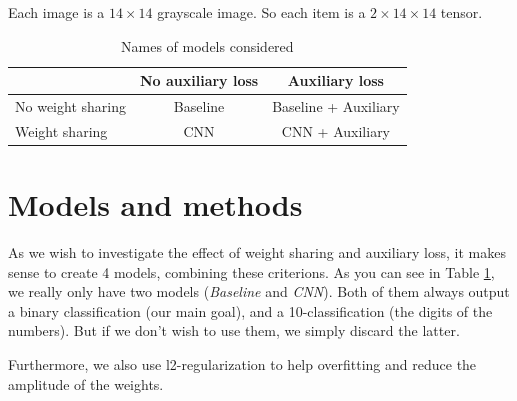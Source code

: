 \documentclass[10pt,conference]{IEEEtran}
\begin{document}
Each image is a $14\times14$ grayscale image. So each item is a $2\times14\times14$ tensor.


\begin{table}[h]
    \begin{tabular}{l|c|c}
        & No auxiliary loss & Auxiliary loss\\
        \hline
        No weight sharing & Baseline & Baseline + Auxiliary\\
        \hline
        Weight sharing & CNN & CNN + Auxiliary
    \end{tabular}
    \label{tab:names_models}
    \caption{Names of models considered}
\end{table}
\section{Models and methods}
As we wish to investigate the effect of weight sharing and auxiliary loss, it makes sense to create 4 models, combining these criterions.
As you can see in Table \ref{tab:names_models}, we really only have two models (\textit{Baseline} and \textit{CNN}). Both of them always output a binary classification (our main goal), and a 10-classification (the digits of the numbers). But if we don't wish to use them, we simply discard the latter.

Furthermore, we also use l2-regularization to help overfitting and reduce the amplitude of the weights.
\end{document}
